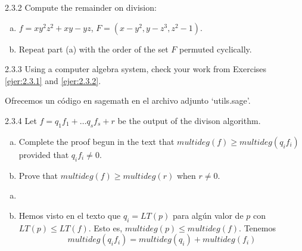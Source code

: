 \documentclass[twoside]{article}
\begin{document}
\begin{ejercicio}{2.3.2}
Compute the remainder on division:
\begin{enumerate}[a.]
\item $f = xy^2z^2 + xy - yz$, $F = (x-y^2, y-z^3, z^2-1)$.
\item Repeat part (a) with the order of the set $F$ permuted cyclically.
\end{enumerate}
\end{ejercicio}

\newpage

\begin{ejercicio}{2.3.3}
Using a computer algebra system, check your work from Exercises \ref{ejer:2.3.1} and \ref{ejer:2.3.2}.
\end{ejercicio}
\begin{solucion}
Ofrecemos un código en sagemath en el archivo adjunto `utils.sage'.
\end{solucion}

\newpage

\begin{ejercicio}{2.3.4}
Let $f = q_1 f_1 + \dots q_s f_s + r$ be the output of the divison algorithm.
\begin{enumerate}[a.]
\item Complete the proof begun in the text that $multideg(f) ≥ multideg(q_i f_i)$ provided that $q_i f_i \neq 0$.
\item Prove that $multideg(f) ≥ multideg(r)$ when $r \neq 0$.
\end{enumerate}
\begin{solucion}
\begin{enumerate}[a.]
\item[]
\item Hemos visto en el texto que $q_i =LT(p)$ para algún valor de $p$ con $LT(p)\leq LT(f)$. Esto es, $multideg(p) \leq multideg(f)$. Tenemos
$$multideg(q_i f_i) =multideg(q_i)+multideg(f_i)$$

\end{enumerate}
\end{solucion}
\end{ejercicio}

\newpage
\end{document}
